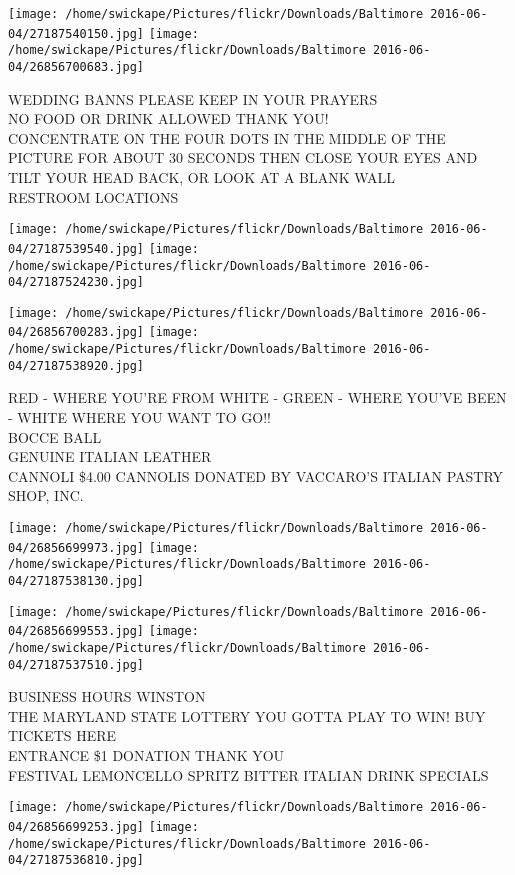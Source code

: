 \documentclass[10pt,letterpaper]{article}
\begin{document}
\texttt{[image: /home/swickape/Pictures/flickr/Downloads/Baltimore 2016-06-04/27187540150.jpg]}
\texttt{[image: /home/swickape/Pictures/flickr/Downloads/Baltimore 2016-06-04/26856700683.jpg]}

WEDDING BANNS PLEASE KEEP IN YOUR PRAYERS\\
NO FOOD OR DRINK ALLOWED THANK YOU!\\
CONCENTRATE ON THE FOUR DOTS IN THE MIDDLE OF THE PICTURE FOR ABOUT 30 SECONDS THEN CLOSE YOUR EYES AND TILT YOUR HEAD BACK, OR LOOK AT A BLANK WALL\\
RESTROOM LOCATIONS
\pagebreak

\texttt{[image: /home/swickape/Pictures/flickr/Downloads/Baltimore 2016-06-04/27187539540.jpg]}
\texttt{[image: /home/swickape/Pictures/flickr/Downloads/Baltimore 2016-06-04/27187524230.jpg]}

\texttt{[image: /home/swickape/Pictures/flickr/Downloads/Baltimore 2016-06-04/26856700283.jpg]}
\texttt{[image: /home/swickape/Pictures/flickr/Downloads/Baltimore 2016-06-04/27187538920.jpg]}

RED {-} WHERE YOU'RE FROM WHITE {-} GREEN {-} WHERE YOU'VE BEEN {-} WHITE WHERE YOU WANT TO GO!!\\
BOCCE BALL\\
GENUINE ITALIAN LEATHER\\
CANNOLI \$4.00 CANNOLIS DONATED BY VACCARO'S ITALIAN PASTRY SHOP, INC.
\pagebreak

\texttt{[image: /home/swickape/Pictures/flickr/Downloads/Baltimore 2016-06-04/26856699973.jpg]}
\texttt{[image: /home/swickape/Pictures/flickr/Downloads/Baltimore 2016-06-04/27187538130.jpg]}

\texttt{[image: /home/swickape/Pictures/flickr/Downloads/Baltimore 2016-06-04/26856699553.jpg]}
\texttt{[image: /home/swickape/Pictures/flickr/Downloads/Baltimore 2016-06-04/27187537510.jpg]}

BUSINESS HOURS WINSTON\\
THE MARYLAND STATE LOTTERY YOU GOTTA PLAY TO WIN!  BUY TICKETS HERE\\
ENTRANCE \$1 DONATION THANK YOU\\
FESTIVAL LEMONCELLO SPRITZ BITTER ITALIAN DRINK SPECIALS
\pagebreak

\texttt{[image: /home/swickape/Pictures/flickr/Downloads/Baltimore 2016-06-04/26856699253.jpg]}
\texttt{[image: /home/swickape/Pictures/flickr/Downloads/Baltimore 2016-06-04/27187536810.jpg]}
\end{document}
